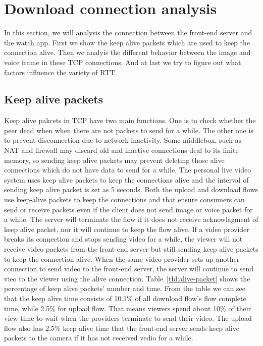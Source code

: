 
\section{Download connection analysis}
\label{sec:download-connection}

In this section, we will analysis the connection between the front-end server and the watch app. First we show the keep alive packets which are used to keep the connection alive. Then we analyis the different behavior between the image and voice frame in these TCP connections. And at last we try to figure out what factors influence the variety of RTT.

\subsection{Keep alive packets}
\label{sub:alive}

Keep alive pakcets in TCP have two main functions. One is to check whether the peer dead when when there are not packets to send for a while. The other one is to prevent disconnection due to network inactivity. Some middlebox, such as NAT and firewall may discard old and inactive connections deal to its finite memory, so sending keep alive packets may prevent deleting those alive connections which do not have data to send for a while. The personal live video system uses keep alive packets to keep the connections alive and the interval of sending keep alive packet is set as 5 seconds. Both the upload and download flows use keep-alive packets to keep the connections and that ensure consumers can send or receive packets even if the client does not send image or voice packet for a while. The server will terminate the flow if it does not receive acknowlagment of keep alive packet, nor it will continue to keep the flow alive. If a video provider breaks its connection and stops sending video for a while, the viewer will not receive video packets from the front-end server but still sending keep alive packets to keep the connection alive. When the same video provider sets up another connection to send video to the front-end server, the server will continue to send vieo to the viewer using the alive connection. Table~\ref{tbl:alive-packet} shows the percentage of keep alive packets' number and time. From the table we can see that the keep alive time consists of 10.1\% of all download flow's flow complete time, while 2.5\% for upload flow. That means viewers spend about 10\% of their view time to wait when the providers terminate to send their video. The upload flow also has 2.5\% keep alive time that the front-end server sends keep alive packets to the camera if it has not received vedio for a while. 

